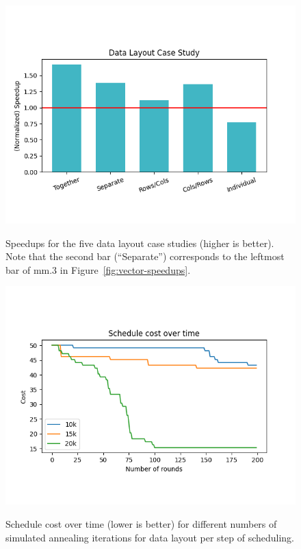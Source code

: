 \begin{figure}[t]
	\centering
    \includegraphics[width=\linewidth]{figures/graphs/case_study.png}
    \vspace{-5em}
    \caption{Speedups for the five data layout case studies (higher is better). Note that the second bar (``Separate'') corresponds to the leftmost bar of {\sf mm.3} in Figure~\ref{fig:vector-speedups}.}
    \label{fig:data-layout-case-study}
\end{figure}
\begin{figure}
    \centering
    \includegraphics[width=\linewidth]{figures/graphs/schedules.png}
    \vspace{-5em}
    \caption{Schedule cost over time (lower is better) for different numbers of simulated annealing iterations for data layout per step of scheduling.}
    \label{fig:schedule-cost}
\end{figure}


